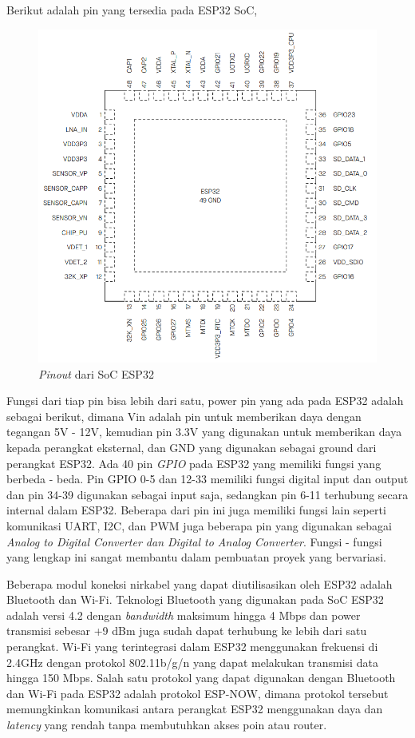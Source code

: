 Berikut adalah pin yang tersedia pada ESP32 SoC,

\begin{figure}[H]
    \centering
    \includegraphics[width=0.45\linewidth]{gambar/pinout-esp32.png}
    \caption{\emph{Pinout} dari SoC ESP32}
    \label{fig:esp-32-pinout}
\end{figure}

Fungsi dari tiap pin bisa lebih dari satu, power pin yang ada pada ESP32 adalah sebagai berikut, dimana Vin adalah pin untuk memberikan daya dengan tegangan 5V - 12V, kemudian pin 3.3V yang digunakan untuk memberikan daya kepada perangkat eksternal, dan GND yang digunakan sebagai ground dari perangkat ESP32.
Ada 40 pin \textit{GPIO} pada ESP32 yang memiliki fungsi yang berbeda - beda. Pin GPIO 0-5 dan 12-33 memiliki fungsi digital input dan output dan pin 34-39 digunakan sebagai input saja, sedangkan pin 6-11 terhubung secara internal dalam ESP32. Beberapa dari pin ini juga memiliki fungsi lain seperti komunikasi UART, I2C, dan PWM juga beberapa pin yang digunakan sebagai \textit{Analog to Digital Converter dan Digital to Analog Converter}. Fungsi - fungsi yang lengkap ini sangat membantu dalam pembuatan proyek yang bervariasi.

Beberapa modul koneksi nirkabel yang dapat diutilisasikan oleh ESP32 adalah Bluetooth dan Wi-Fi. Teknologi Bluetooth yang digunakan pada SoC ESP32 adalah versi 4.2 dengan \textit{bandwidth} maksimum hingga 4 Mbps dan power transmisi sebesar +9 dBm juga sudah dapat terhubung ke lebih dari satu perangkat. Wi-Fi yang terintegrasi dalam ESP32 menggunakan frekuensi di 2.4GHz dengan protokol 802.11b/g/n yang dapat melakukan transmisi data hingga 150 Mbps. Salah satu protokol yang dapat digunakan dengan Bluetooth dan Wi-Fi pada ESP32 adalah protokol ESP-NOW, dimana protokol tersebut memungkinkan komunikasi antara perangkat ESP32 menggunakan daya dan \textit{latency} yang rendah tanpa membutuhkan akses poin atau router. \parencite{esp32-datasheer}


